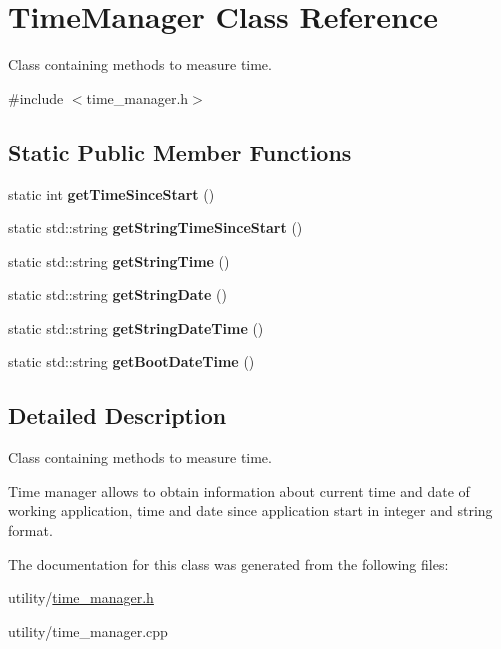 \hypertarget{class_time_manager}{}\section{Time\+Manager Class Reference}
\label{class_time_manager}


Class containing methods to measure time.  




{\ttfamily \#include $<$time\+\_\+manager.\+h$>$}

\subsection*{Static Public Member Functions}
\begin{DoxyCompactItemize}
\item 
\mbox{\label{class_time_manager_ad42a2f423c6c3310112abc3c5c742c9e}} 
static int {\bfseries get\+Time\+Since\+Start} ()
\item 
\mbox{\label{class_time_manager_aff5359efb14111764aa373367bafa9cc}} 
static std\+::string {\bfseries get\+String\+Time\+Since\+Start} ()
\item 
\mbox{\label{class_time_manager_a61b14a72a2f2de8405c8b6b8037561ac}} 
static std\+::string {\bfseries get\+String\+Time} ()
\item 
\mbox{\label{class_time_manager_ac67de828c7e298b8796c027cafde7479}} 
static std\+::string {\bfseries get\+String\+Date} ()
\item 
\mbox{\label{class_time_manager_a9811ffb8e35957521d0de842ca806206}} 
static std\+::string {\bfseries get\+String\+Date\+Time} ()
\item 
\mbox{\label{class_time_manager_ac9d0eb40ce9e29901f23d5b7b22712ff}} 
static std\+::string {\bfseries get\+Boot\+Date\+Time} ()
\end{DoxyCompactItemize}


\subsection{Detailed Description}
Class containing methods to measure time. 

Time manager allows to obtain information about current time and date of working application, time and date since application start in integer and string format. 

The documentation for this class was generated from the following files\+:\begin{DoxyCompactItemize}
\item 
utility/\hyperlink{time__manager_8h}{time\+\_\+manager.\+h}\item 
utility/time\+\_\+manager.\+cpp\end{DoxyCompactItemize}
